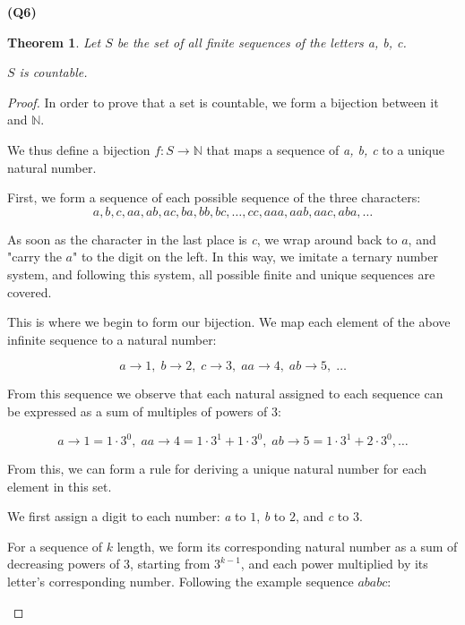 \documentclass[12pt, a4paper]{article}
\newcommand{\N}{\mathbb{N}}
\newtheorem{theorem}{Theorem}
\begin{document}
\noindent\textbf{(Q6)}

\begin{theorem}
    Let $S$ be the set of all finite sequences of the letters \emph{a, b, c}.

    $S$ is countable.
\end{theorem}

\begin{proof}
    In order to prove that a set is countable, we form a bijection between it and $\N$.

    We thus define a bijection $f \colon S \to \N$ that maps a sequence of \textit{a, b, c}
    to a unique natural number.

    First, we form a sequence of each possible sequence of the three characters:
    \[
        a, b, c, aa, ab, ac, ba, bb, bc, \ldots, cc, aaa, aab, aac, aba, \ldots
    \]

    As soon as the character in the last place is \textit{c}, we wrap around back to 
    $a$, and "carry the $a$" to the digit on the left. In this way, we imitate a 
    ternary number system, and following this system, all possible finite and 
    unique sequences are covered.
    
    This is where we begin to form our bijection. We map each element of the above
    infinite sequence to a natural number:

    \[
        a \to 1, \; b \to 2, \; c \to 3, \; aa \to 4, \; ab \to 5, \; \ldots
    \]

    From this sequence we observe that each natural assigned to each sequence can
    be expressed as a sum of multiples of powers of 3:

    \[
        a \to 1 = 1 \cdot 3^0,\; aa \to 4 = 1 \cdot 3^1 + 1 \cdot 3^0,\; 
        ab \to 5 = 1 \cdot 3^1 + 2 \cdot 3^0, \ldots
    \]

    From this, we can form a rule for deriving a unique natural number for each element in this
    set.
    
    We first assign a digit to each number: \textit{a} to $1$, \textit{b} to $2$, and \textit{c} to $3$.

    For a sequence of $k$ length, we form its
    corresponding natural number as a sum of decreasing powers of 3, starting from $3^{k - 1}$,
    and each power multiplied by its letter's corresponding number.
    Following the example sequence $ababc$:
    \begin{center}


\end{center}
\end{proof}
\end{document}
